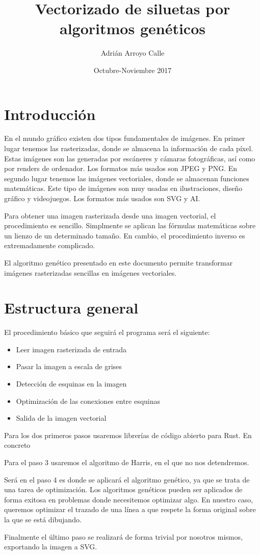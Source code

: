 \documentclass{report}
\title{Vectorizado de siluetas por algoritmos genéticos}
\author{Adrián Arroyo Calle}
\date{ Octubre-Noviembre 2017}
\begin{document}
\maketitle

\section{Introducción}
En el mundo gráfico existen dos tipos fundamentales de imágenes. En primer lugar tenemos las rasterizadas, donde se almacena la información de cada píxel. Estas imágenes son las generadas por escáneres y cámaras fotográficas, así como por renders de ordenador. Los formatos más usados son JPEG y PNG. En segundo lugar tenemos las imágenes vectoriales, donde se almacenan funciones matemáticas. Este tipo de imágenes son muy usadas en ilustraciones, diseño gráfico y videojuegos. Los formatos más usados son SVG y AI. 

Para obtener una imagen rasterizada desde una imagen vectorial, el procedimiento es sencillo. Simplmente se aplican las fórmulas matemáticas sobre un lienzo de un determinado tamaño. En cambio, el procedimiento inverso es extremadamente complicado. 

El algoritmo genético presentado en este documento permite transformar imágenes rasterizadas sencillas en imágenes vectoriales.

\section{Estructura general}

El procedimiento básico que seguirá el programa será el siguiente:

\begin{itemize}
	\item Leer imagen rasterizada de entrada
	\item Pasar la imagen a escala de grises
	\item Detección de esquinas en la imagen
	\item Optimización de las conexiones entre esquinas
	\item Salida de la imagen vectorial
\end{itemize}

Para los dos primeros pasos usaremos librerías de código abierto para Rust. En concreto %

Para el paso 3 usaremos el algoritmo de Harris, en el que no nos detendremos.

Será en el paso 4 es donde se aplicará el algoritmo genético, ya que se trata de una tarea de optimización. Los algoritmos genéticos pueden ser aplicados de forma exitosa en problemas donde necesitemos optimizar algo. En nuestro caso, queremos optimizar el trazado de una línea a que respete la forma original sobre la que se está dibujando.

Finalmente el último paso se realizará de forma trivial por nosotros mismos, exportando la imagen a SVG.
\end{document}
